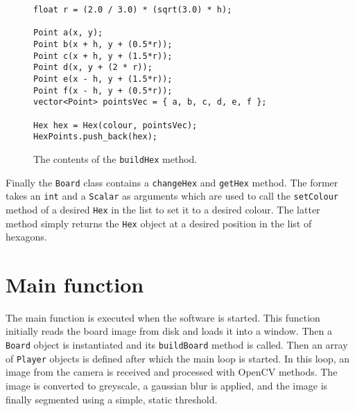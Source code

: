 \begin{figure}
\begin{lstlisting}
float r = (2.0 / 3.0) * (sqrt(3.0) * h);

Point a(x, y);
Point b(x + h, y + (0.5*r));
Point c(x + h, y + (1.5*r));
Point d(x, y + (2 * r));
Point e(x - h, y + (1.5*r));
Point f(x - h, y + (0.5*r));
vector<Point> pointsVec = { a, b, c, d, e, f };

Hex hex = Hex(colour, pointsVec);
HexPoints.push_back(hex);
\end{lstlisting}
\caption{The contents of the \texttt{buildHex} method. \label{fig:buildHexMethod}}
\end{figure}

Finally the \texttt{Board} class contains a \texttt{changeHex} and \texttt{getHex} method. The former takes an \texttt{int} and a \texttt{Scalar} as arguments which are used to call the \texttt{setColour} method of a desired \texttt{Hex} in the list to set it to a desired colour. The latter method simply returns the \texttt{Hex} object at a desired position in the list of hexagons.

\section{Main function}
The main function is executed when the software is started. This function initially reads the board image from disk and loads it into a window. Then a \texttt{Board} object is instantiated and its \texttt{buildBoard} method is called. Then an array of \texttt{Player} objects is defined after which the main loop is started. In this loop, an image from the camera is received and processed with OpenCV methods. The image is converted to greyscale, a gaussian blur is applied, and the image is finally segmented using a simple, static threshold.

\begin{figure}
\begin{lstlisting}
\end{lstlisting}
\end{figure}